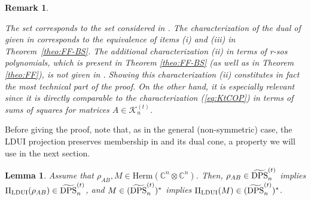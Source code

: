 \documentclass[11pt]{article}
\newcommand{\C}{\ensuremath{\mathbb{C}}} %
\newcommand{\MK}{{\mathcal K}}
\newcommand{\Herm}{\mathrm{Herm}}
\newcommand{\Cnn}{\C^n\ot \C^n}
\newcommand{\SEP}{\text{\rm SEP}}
\newcommand{\COP}{\text{\rm COP}}
\newcommand{\LDUI}{\text{\rm LDUI}}
\newcommand{\DPS}{\text{\rm DPS}}
\newcommand{\SEPBS}{\SEP^{\BS}}
\newcommand{\tilDPS}{\widetilde {\DPS}}
\newcommand{\tilDPSt}{\widetilde{\DPS}^{(t)}}
\newcommand{\ot}{\otimes}
\newcommand{\PiLDUI}{\Pi_{\LDUI}}
\newcommand{\BS}{\text{\rm BS}}
\theoremstyle{plain}
\newtheorem{lemma}[satz]{Lemma}
\newtheorem{remark}[satz]{Remark}
\newcommand{\ML}{\textcolor{blue}}
\begin{document}
\begin{remark}\label{rem:compare-GNP}

The set \smash{$\tilDPSt_n$} corresponds to the set   considered in \cite{GNP_2025}. 
The characterization of the dual of  given in 
 \cite[Prop.~8.9]{GNP_2025}  corresponds to the equivalence of items (i) and (iii) in Theorem~\ref{theo:FF-BS}. 
The additional characterization (ii) in terms of r-sos polynomials, %
which is present in  Theorem  \ref{theo:FF-BS} (as well as in Theorem \ref{theo:FF}), is not given in \cite{GNP_2025}. Showing   this characterization (ii) constitutes in fact  the most technical part of the proof.
On the other hand, it
 is especially relevant since it is directly comparable to the characterization (\ref{eq:KtCOP}) in terms of sums of squares    for matrices $A\in \MK^{(t)}_n$. 
 \end{remark}

Before giving the proof, note that, as 
 in the general (non-symmetric) case, the LDUI projection preserves membership in \smash{$\tilDPSt_n$}and its dual cone, a property we will use in the next section.

\begin{lemma}\label{lem:LDUI-BS} 
Assume that $\rho_{AB}, M\in \Herm(\Cnn)$. Then,
 $\rho_{AB}\in \tilDPSt_n$ implies  $\PiLDUI(\rho_{AB})\in \tilDPSt_n$, and 
 $M\in (\tilDPSt_n)^*$ implies $\PiLDUI(M)\in (\tilDPSt_n)^*$.
 \end{lemma}
 
\end{document}

